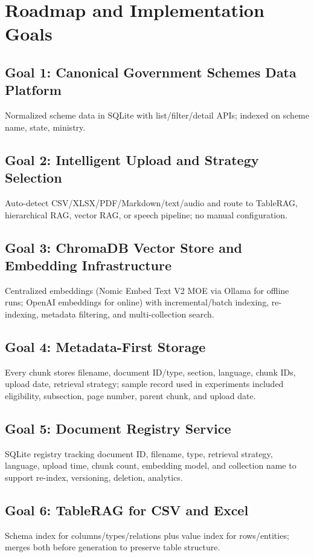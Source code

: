 \documentclass[11pt,a4paper]{article}
\begin{document}
\section{Roadmap and Implementation Goals}

\subsection{Goal 1: Canonical Government Schemes Data Platform}
Normalized scheme data in SQLite with list/filter/detail APIs; indexed on scheme name, state, ministry.

\subsection{Goal 2: Intelligent Upload and Strategy Selection}
Auto-detect CSV/XLSX/PDF/Markdown/text/audio and route to TableRAG, hierarchical RAG, vector RAG, or speech pipeline; no manual configuration.

\subsection{Goal 3: ChromaDB Vector Store and Embedding Infrastructure}
Centralized embeddings (Nomic Embed Text V2 MOE via Ollama for offline runs; OpenAI embeddings for online) with incremental/batch indexing, re-indexing, metadata filtering, and multi-collection search.

\subsection{Goal 4: Metadata-First Storage}
Every chunk stores filename, document ID/type, section, language, chunk IDs, upload date, retrieval strategy; sample record used in experiments included eligibility, subsection, page number, parent chunk, and upload date.

\subsection{Goal 5: Document Registry Service}
SQLite registry tracking document ID, filename, type, retrieval strategy, language, upload time, chunk count, embedding model, and collection name to support re-index, versioning, deletion, analytics.

\subsection{Goal 6: TableRAG for CSV and Excel}
Schema index for columns/types/relations plus value index for rows/entities; merges both before generation to preserve table structure.
\end{document}
